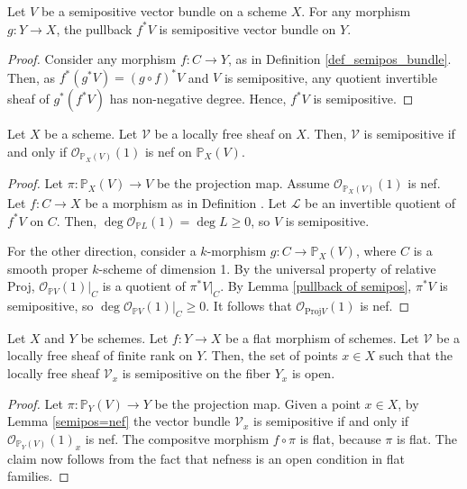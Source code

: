 \begin{lemma}\label{pullback of semipos}
Let $V$ be a semipositive vector bundle on a scheme $X$. For any morphism $g:Y\to X$, the pullback $f^*V$ is semipositive vector bundle on $Y$.
\end{lemma}
\begin{proof}
Consider any morphism $f:C\to Y$, as in Definition \ref{def_semipos_bundle}. 
Then, as $f^*(g^*V)=(g\circ f)^*V$ and $V$ is semipositive, any quotient invertible sheaf of $g^*(f^*V)$ has non-negative degree. 
Hence, $f^*V$ is semipositive.
\end{proof}

\begin{lemma}\label{semipos=nef}
Let $X$ be a scheme.
Let $\mathcal{V}$ be a locally free sheaf on $X$.
Then, $\mathcal{V}$ is semipositive if and only if $\mathcal{O}_{\mathbb{P}_X(V)}(1)$ is nef on $\mathbb{P}_X(V)$.
\end{lemma}

\begin{proof}
Let $\pi:\mathbb{P}_X(V)\to V$ be the projection map. 
Assume $\mathcal{O}_{\mathbb{P}_X(V)}(1)$ is nef.
Let $f:C\to X$ be a morphism as in Definition \label{def_semipos_bundle}.
Let $\mathcal{L}$ be an invertible quotient of $f^*V$ on $C$. 
Then, $\deg \mathcal{O}_{\mathbb{P}L}(1)=\deg L\ge0$, so $V$ is semipositive.

For the other direction, consider a $k$-morphism $g:C\to\mathbb{P}_X(V)$, where $C$ is a smooth proper $k$-scheme of dimension 1.
By the universal property of relative Proj, $\mathcal{O}_{\mathbb{P}V}(1)|_C$ is a quotient of $\pi^*V|_C$. 
By Lemma \ref{pullback of semipos}, $\pi^*V$ is semipositive, so $\deg\mathcal{O}_{\mathbb{P}V}(1)|_C\geq 0$.
It follows that $\mathcal{O}_{\mathrm{Proj} V}(1)$ is nef.
\end{proof}



\begin{lemma}\label{semipos_locus_open}
Let $X$ and $Y$ be schemes.
Let $f:Y\to X$ be a flat morphism of schemes.
Let $\mathcal{V}$ be a locally free sheaf of finite rank on $Y$.
Then, the set of points $x\in X$ such that the locally free sheaf $\mathcal{V}_x$ is semipositive on the fiber $Y_x$ is open.
\end{lemma}

\begin{proof}
Let $\pi:\mathbb{P}_Y(V)\to Y$ be the projection map.
Given a point $x\in X$, by Lemma \ref{semipos=nef} the vector bundle $\mathcal{V}_x$ is semipositive if and only if $\mathcal{O}_{\mathbb{P}_Y(V)}(1)_x$ is nef. 
The compositve morphism $f\circ \pi$ is flat, because $\pi$ is flat.
The claim now follows from the fact that nefness is an open condition in flat families.
\end{proof}


